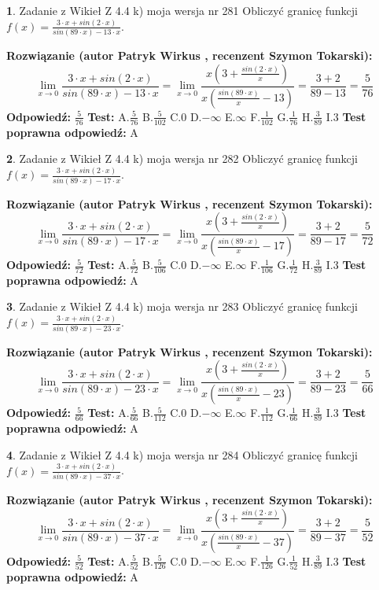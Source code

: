 \documentclass[12pt, a4paper]{article}
\theoremstyle{definition} %
\newtheorem{zad}{}
\newcommand{\zadStart}[1]{\begin{zad}#1\newline}
\newcommand{\zadStop}{\end{zad}}
\newcommand{\rozwStart}[2]{\noindent \textbf{Rozwiązanie (autor #1 , recenzent #2): }\newline}
\newcommand{\rozwStop}{\newline}
\newcommand{\odpStart}{\noindent \textbf{Odpowiedź:}\newline}
\newcommand{\odpStop}{\newline}
\newcommand{\testStart}{\noindent \textbf{Test:}\newline}
\newcommand{\testStop}{\newline}
\newcommand{\kluczStart}{\noindent \textbf{Test poprawna odpowiedź:}\newline}
\newcommand{\kluczStop}{\newline}
\begin{document}
\zadStart{Zadanie z Wikieł Z 4.4 k) moja wersja nr 281}
Obliczyć granicę funkcji $f(x)=\frac{3\cdot x +sin(2\cdot x)}{sin(89\cdot x) -13\cdot x}$.
\zadStop
\rozwStart{Patryk Wirkus}{Szymon Tokarski}
$$\lim\limits_{x\to 0}\frac{3\cdot x +sin(2\cdot x)}{sin(89\cdot x) -13\cdot x}
=\lim\limits_{x\to 0}\frac{x(3+\frac{sin(2\cdot x)}{x})}{x(\frac{sin(89\cdot x)}{x}-13)}
=\frac{3+2}{89-13} = \frac{5}{76}$$
\rozwStop
\odpStart
$\frac{5}{76}$
\odpStop
\testStart
A.$\frac{5}{76}$
B.$\frac{5}{102}$
C.$0$
D.$-\infty$
E.$\infty$
F.$\frac{1}{102}$
G.$\frac{1}{76}$
H.$\frac{3}{89}$
I.$3$
\testStop
\kluczStart
A
\kluczStop



\zadStart{Zadanie z Wikieł Z 4.4 k) moja wersja nr 282}
Obliczyć granicę funkcji $f(x)=\frac{3\cdot x +sin(2\cdot x)}{sin(89\cdot x) -17\cdot x}$.
\zadStop
\rozwStart{Patryk Wirkus}{Szymon Tokarski}
$$\lim\limits_{x\to 0}\frac{3\cdot x +sin(2\cdot x)}{sin(89\cdot x) -17\cdot x}
=\lim\limits_{x\to 0}\frac{x(3+\frac{sin(2\cdot x)}{x})}{x(\frac{sin(89\cdot x)}{x}-17)}
=\frac{3+2}{89-17} = \frac{5}{72}$$
\rozwStop
\odpStart
$\frac{5}{72}$
\odpStop
\testStart
A.$\frac{5}{72}$
B.$\frac{5}{106}$
C.$0$
D.$-\infty$
E.$\infty$
F.$\frac{1}{106}$
G.$\frac{1}{72}$
H.$\frac{3}{89}$
I.$3$
\testStop
\kluczStart
A
\kluczStop



\zadStart{Zadanie z Wikieł Z 4.4 k) moja wersja nr 283}
Obliczyć granicę funkcji $f(x)=\frac{3\cdot x +sin(2\cdot x)}{sin(89\cdot x) -23\cdot x}$.
\zadStop
\rozwStart{Patryk Wirkus}{Szymon Tokarski}
$$\lim\limits_{x\to 0}\frac{3\cdot x +sin(2\cdot x)}{sin(89\cdot x) -23\cdot x}
=\lim\limits_{x\to 0}\frac{x(3+\frac{sin(2\cdot x)}{x})}{x(\frac{sin(89\cdot x)}{x}-23)}
=\frac{3+2}{89-23} = \frac{5}{66}$$
\rozwStop
\odpStart
$\frac{5}{66}$
\odpStop
\testStart
A.$\frac{5}{66}$
B.$\frac{5}{112}$
C.$0$
D.$-\infty$
E.$\infty$
F.$\frac{1}{112}$
G.$\frac{1}{66}$
H.$\frac{3}{89}$
I.$3$
\testStop
\kluczStart
A
\kluczStop



\zadStart{Zadanie z Wikieł Z 4.4 k) moja wersja nr 284}
Obliczyć granicę funkcji $f(x)=\frac{3\cdot x +sin(2\cdot x)}{sin(89\cdot x) -37\cdot x}$.
\zadStop
\rozwStart{Patryk Wirkus}{Szymon Tokarski}
$$\lim\limits_{x\to 0}\frac{3\cdot x +sin(2\cdot x)}{sin(89\cdot x) -37\cdot x}
=\lim\limits_{x\to 0}\frac{x(3+\frac{sin(2\cdot x)}{x})}{x(\frac{sin(89\cdot x)}{x}-37)}
=\frac{3+2}{89-37} = \frac{5}{52}$$
\rozwStop
\odpStart
$\frac{5}{52}$
\odpStop
\testStart
A.$\frac{5}{52}$
B.$\frac{5}{126}$
C.$0$
D.$-\infty$
E.$\infty$
F.$\frac{1}{126}$
G.$\frac{1}{52}$
H.$\frac{3}{89}$
I.$3$
\testStop
\kluczStart
A
\kluczStop
\end{document}
